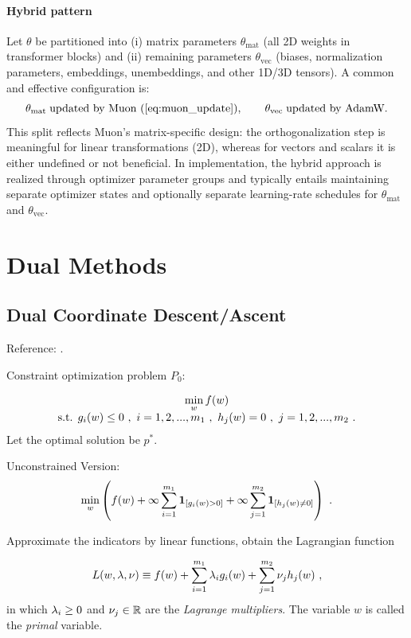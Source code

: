 \paragraph*{Hybrid pattern}
Let $\theta$ be partitioned into (i) matrix parameters $\theta_{\mathrm{mat}}$ (all 2D weights in transformer blocks) and (ii) remaining parameters $\theta_{\mathrm{vec}}$ (biases, normalization parameters, embeddings, unembeddings, and other 1D/3D tensors). A common and effective configuration is:
\[
\theta_{\mathrm{mat}} \;\text{updated by Muon (}\eqref{eq:muon_update}\text{)}, 
\qquad
\theta_{\mathrm{vec}} \;\text{updated by AdamW}.
\]
This split reflects Muon's matrix-specific design: the orthogonalization step is meaningful for linear transformations (2D), whereas for vectors and scalars it is either undefined or not beneficial. In implementation, the hybrid approach is realized through optimizer parameter groups and typically entails maintaining separate optimizer states and optionally separate learning-rate schedules for $\theta_{\mathrm{mat}}$ and $\theta_{\mathrm{vec}}$.

\section{Dual Methods}
\label{Ch:OptimizationModernML:Dual}

\subsection{Dual Coordinate Descent/Ascent}

Reference: \cite[Chapters 13 and 14]{NocedalWrightNumericalOptimization}.

Constraint optimization problem $P_0$:

$$\begin{array}{c}
\min\limits_{w}f(w) \\
\text{s.t. } g_i(w)\leq 0 \ , \ i=1,2,...,m_1 \ , \
h_j(w)=0 \ , \ j=1,2,...,m_2  \ . \\
\end{array}$$
Let the optimal solution be $p^*$.

Unconstrained Version:
$$\min\limits_{w}\left(f(w)+\infty\sum\limits_{i=1}^{m_1}\mathbf 1_{[g_i(w)>0]}+\infty\sum\limits_{j=1}^{m_2}\mathbf 1_{[h_j(w)\neq 0]}\right) \ .$$

Approximate the indicators by linear functions, obtain the Lagrangian function

$$L(w,\lb,\nu)\equiv f(w)+\sum\li_{i=1}^{m_1}\lb_i g_i(w)+\sum\li_{j=1}^{m_2}\nu_j h_j(w)  \ ,$$
in which $\lambda_i\geq 0$ and $\nu_j\in \mathbb R$ are the \textit{Lagrange multipliers}. The variable $w$ is called the \textit{primal} variable.

